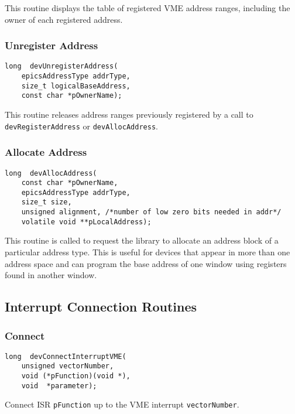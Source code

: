 This routine displays the table of registered VME address ranges, including the owner of each registered address.

\subsubsection{Unregister Address}

\begin{verbatim}
long  devUnregisterAddress(
    epicsAddressType addrType,
    size_t logicalBaseAddress,
    const char *pOwnerName);
\end{verbatim}

This routine releases address ranges previously registered by a call to \verb|devRegisterAddress| or \verb|devAllocAddress|.

\subsubsection{Allocate Address}

\begin{verbatim}
long  devAllocAddress(
    const char *pOwnerName,
    epicsAddressType addrType,
    size_t size,
    unsigned alignment, /*number of low zero bits needed in addr*/
    volatile void **pLocalAddress);
\end{verbatim}

This routine is called to request the library to allocate an address block of a particular address type. This is useful for 
devices that appear in more than one address space and can program the base address of one window using registers found 
in another window.

\subsection{Interrupt Connection Routines}

\subsubsection{Connect}

\begin{verbatim}
long  devConnectInterruptVME(
    unsigned vectorNumber,
    void (*pFunction)(void *),
    void  *parameter);
\end{verbatim}

Connect ISR \verb|pFunction| up to the VME interrupt \verb|vectorNumber|.

